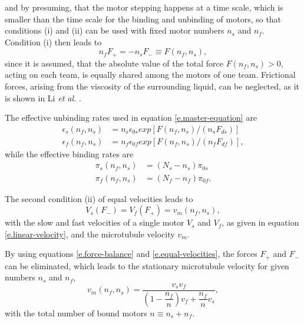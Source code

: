 and by presuming, that the motor stepping happens at a time scale, which is smaller than the time scale for the binding and unbinding of motors, so that conditions (i) and (ii) can be used with fixed motor
numbers $n_s$ and $n_f$. Condition (i) then leads to
\begin{equation}\label{e.force-balance}
 n_fF_+ = -n_sF_- \equiv F\left(n_f, n_s\right),
\end{equation}
since it is assumed, that the absolute value of the total force \mbox{$F\left(n_f, n_s\right) > 0$}, acting on each team, is equally shared among the motors of one team. Frictional forces,
arising from the viscosity of the surrounding liquid, can be neglected, as it is shown in Li \textit{et al.} \cite{li}.

The effective unbinding rates used in equation \eqref{e.master-equation} are
\begin{equation}\label{e.effective-unbinding-rates}
\begin{aligned}
 \epsilon_s\left(n_f, n_s\right) &= n_s\epsilon_{0s}exp\left[F\left(n_f, n_s\right)/\left(n_sF_{ds}\right)\right] \\
 \epsilon_f\left(n_f, n_s\right) &= n_f\epsilon_{0f}exp\left[F\left(n_f, n_s\right)/\left(n_fF_{df}\right)\right],
\end{aligned}
\end{equation}
while the effective binding rates are
\begin{equation}\label{e.effective-binding-rates}
\begin{aligned}
 \pi_s\left(n_f, n_s\right) &= \left(N_s - n_s\right)\pi_{0s} \\
 \pi_f\left(n_f, n_s\right) &= \left(N_f - n_f\right)\pi_{0f}.
\end{aligned}
\end{equation}

The second condition (ii) of equal velocities leads to
\begin{equation}\label{e.equal-velocities}
 V_s\left(F_-\right) = V_f\left(F_+\right) = v_m\left(n_f, n_s\right),
\end{equation}
with the slow and fast velocities of a single motor $V_s$ and $V_f$, as given in equation \eqref{e.linear-velocity}, and the microtubule velocity $v_m$. 

By using equations \eqref{e.force-balance} and \eqref{e.equal-velocities}, the forces $F_+$ and $F_-$ can be eliminated, which leads to the stationary microtubule velocity for given numbers $n_s$
and $n_f$,
\begin{equation}\label{e.mt-velocity}
 v_m\left(n_f, n_s\right) = \frac{v_sv_f}{\left(1 - \dfrac{n_f}{n}\right)v_f + \dfrac{n_f}{n}v_s},
\end{equation}
with the total number of bound motors \mbox{$n \equiv n_s + n_f$}.

